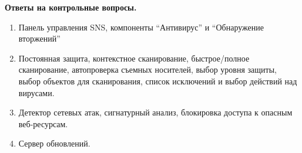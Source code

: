 \documentclass[a4paper,14pt]{extarticle}
\begin{document}
    \textbf{Ответы на контрольные вопросы.}

    \begin{enumerate}
        \singlespacing
        \item Панель управления SNS, компоненты “Антивирус” и “Обнаружение вторжений”
        \item Постоянная защита, контекстное сканирование, быстрое/полное сканирование, автопроверка съемных носителей, выбор уровня защиты, выбор объектов для сканирования, список исключений и выбор действий над вирусами.
        \item Детектор сетевых атак, сигнатурный анализ, блокировка доступа к опасным веб-ресурсам.
        \item Сервер обновлений.
    \end{enumerate}
\end{document}
